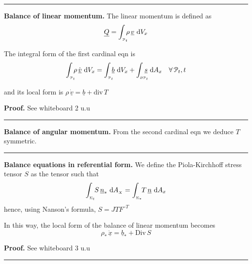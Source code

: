 \rule{0.31\textwidth}{0.2pt}
\smallskip

\textbf{Balance of linear momentum.} The linear momentum is defined as
\begin{equation*}
\underline{Q}=\int_{_{\EuScript{P}_t}}\!\!\! \rho\,\underline{v}\ \mathrm{d} V_x
\end{equation*}

The integral form of the first cardinal eqn is
\begin{equation*}
\int_{_{\pt_t}}\!\!\! \rho\,\dot{\underline{v}}\ \de V_x=\int_{_{\pt_t}}\!\!\! \underline{b}\ \de V_{x}+\int_{_{\partial \pt_t}}\!\!\!\!\! \underline{s}\ \de A_x\quad \forall\, \pt_t,t
\end{equation*}

and its local form is $\boxed{\rho\,\dot{\underline{v}}=\underline{b}+\text{div}\,T}$

\medskip

\textbf{\color{lavender(floral)}Proof.} See whiteboard 2 u.u

\vspace{-0.5em}

\rule{0.31\textwidth}{0.2pt}
\smallskip

\textbf{Balance of angular momentum.} From the second cardinal eqn we deduce $T$ symmetric.

\vspace{-0.5em}

\rule{0.31\textwidth}{0.2pt}
\smallskip

\textbf{Balance equations in referential form.} We define the Piola-Kirchhoff stress tensor $S$ as the tensor such that
\begin{equation*}
\int_{_{\Sigma_t}}\!\! S\,\underline{n}_*\ \mathrm{d} A_{_X}=\int_{_{\Sigma_*}}\!\! T\,\underline{n}\ \mathrm{d} A_x 
\end{equation*}
hence, using Nanson's formula, $\boxed{S=JTF^{\,\text{-}T}}$

\medskip

In this way, the local form of the balance of linear momentum becomes
\begin{equation*}
\boxed{\rho_*\,\ddot{\underline{x}}=\underline{b}_*+\text{Div}\,S}
\end{equation*}

\textbf{\color{lavender(floral)}Proof.} See whiteboard 3 u.u

\vspace{-0.5em}

\rule{0.31\textwidth}{0.2pt}

\newcolumn


